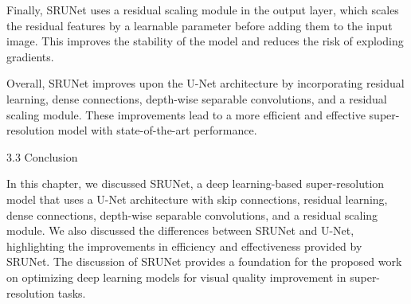 Finally, SRUNet uses a residual scaling module in the output layer, which scales the residual features by a learnable parameter before adding them to the input image. This improves the stability of the model and reduces the risk of exploding gradients.

Overall, SRUNet improves upon the U-Net architecture by incorporating residual learning, dense connections, depth-wise separable convolutions, and a residual scaling module. These improvements lead to a more efficient and effective super-resolution model with state-of-the-art performance.

3.3 Conclusion

In this chapter, we discussed SRUNet, a deep learning-based super-resolution model that uses a U-Net architecture with skip connections, residual learning, dense connections, depth-wise separable convolutions, and a residual scaling module. We also discussed the differences between SRUNet and U-Net, highlighting the improvements in efficiency and effectiveness provided by SRUNet. The discussion of SRUNet provides a foundation for the proposed work on optimizing deep learning models for visual quality improvement in super-resolution tasks.
